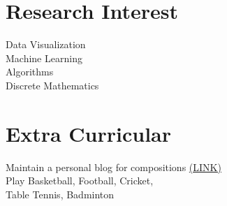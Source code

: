 \documentclass[]{deedy-resume-openfont}
\begin{document}
\begin{minipage}[t]{0.33\textwidth}

\section{Research Interest}
\textbullet{}  Data Visualization \\
\textbullet{}  Machine Learning \\
\textbullet{}  Algorithms \\
\textbullet{}  Discrete Mathematics \\
\sectionsep




\section{Extra Curricular}
\textbullet{}  Maintain a personal blog for compositions \href{http://pratikmishra.in/blog/}{(LINK)} \\
\textbullet{}  Play Basketball, Football, Cricket,\\ Table Tennis, Badminton \\
\sectionsep


%
%

\end{minipage} 
\hfill
\end{document}
